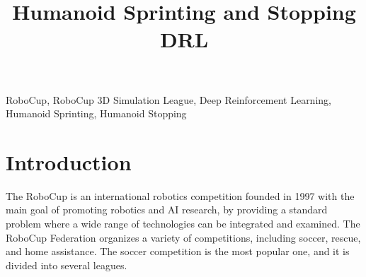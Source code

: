 \documentclass[conference]{IEEEtran}
\begin{document}
\title{Humanoid Sprinting and Stopping DRL\\
}

\author{

    \and

    \and

}


\maketitle

\begin{abstract}



\end{abstract}

\begin{IEEEkeywords}

RoboCup, RoboCup 3D Simulation League, Deep Reinforcement Learning, Humanoid Sprinting, Humanoid Stopping

\end{IEEEkeywords}

\section{Introduction}

The RoboCup is an international robotics competition founded in 1997 with the main goal of promoting robotics and AI research,
by providing a standard problem where a wide range of technologies can be integrated and examined.
The RoboCup Federation organizes a variety of competitions, including soccer, rescue, and home assistance.
The soccer competition is the most popular one, and it is divided into several leagues.
\end{document}
